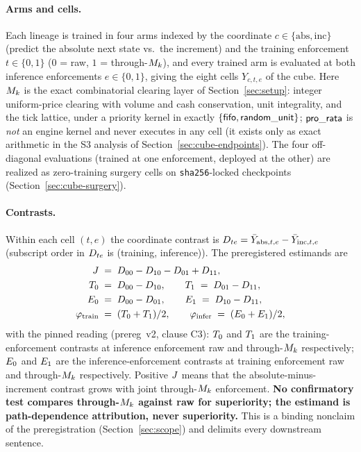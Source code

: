 \paragraph{Arms and cells.}
Each lineage is trained in four arms indexed by the coordinate $c \in
\{\mathrm{abs},\mathrm{inc}\}$ (predict the absolute next state vs.\ the
increment) and the training enforcement $t \in \{0,1\}$ ($0$ = raw, $1$ =
through-$M_k$), and every trained arm is evaluated at both inference
enforcements $e \in \{0,1\}$, giving the eight cells $Y_{c,t,e}$ of the cube.
Here $M_k$ is the exact combinatorial clearing layer of
Section~\ref{sec:setup}: integer uniform-price clearing with volume and cash
conservation, unit integrality, and the tick lattice, under a priority kernel
in exactly $\{\mathsf{fifo}, \mathsf{random\_unit}\}$; $\mathsf{pro\_rata}$ is \emph{not} an engine kernel and
never executes in any cell (it exists only as exact arithmetic in the S3
analysis of Section~\ref{sec:cube-endpoints}). The four off-diagonal
evaluations (trained at one enforcement, deployed at the other) are realized
as zero-training surgery cells on \texttt{sha256}-locked checkpoints
(Section~\ref{sec:cube-surgery}).

\paragraph{Contrasts.}
Within each cell $(t,e)$ the coordinate contrast is
$D_{te} = \bar Y_{\mathrm{abs},t,e} - \bar Y_{\mathrm{inc},t,e}$
(subscript order in $D_{te}$ is (training, inference)). The
preregistered estimands are
\begin{align}
J \;&=\; D_{00} - D_{10} - D_{01} + D_{11},\\
T_{0} \;&=\; D_{00} - D_{10}, \qquad
T_{1} \;=\; D_{01} - D_{11},\\
E_{0} \;&=\; D_{00} - D_{01}, \qquad
E_{1} \;=\; D_{10} - D_{11},\\
\varphi_{\mathrm{train}} \;&=\; (T_{0} + T_{1})/2, \qquad
\varphi_{\mathrm{infer}} \;=\; (E_{0} + E_{1})/2,
\end{align}
with the pinned reading (prereg~v2, clause C3): $T_{0}$ and $T_{1}$ are the
training-enforcement contrasts at inference enforcement raw and through-$M_k$
respectively; $E_{0}$ and $E_{1}$ are the inference-enforcement contrasts at
training enforcement raw and through-$M_k$ respectively. Positive $J$
means that the absolute-minus-increment contrast grows with joint through-$M_k$
enforcement. \textbf{No confirmatory test compares through-$M_k$ against raw
for superiority; the estimand is path-dependence attribution, never
superiority.} This is a binding nonclaim of the preregistration
(Section~\ref{sec:scope}) and delimits every downstream sentence.

